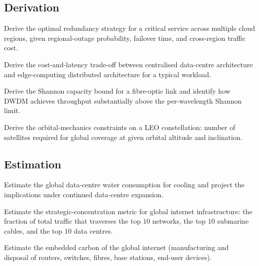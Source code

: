 \subsection*{Derivation}

\begin{exercise}
Derive the optimal redundancy strategy for a critical service across multiple cloud regions, given regional-outage probability, failover time, and cross-region traffic cost.
\end{exercise}

\begin{exercise}
Derive the cost-and-latency trade-off between centralised data-centre architecture and edge-computing distributed architecture for a typical workload.
\end{exercise}

\begin{exercise}
Derive the Shannon capacity bound for a fibre-optic link and identify how DWDM achieves throughput substantially above the per-wavelength Shannon limit.
\end{exercise}

\begin{exercise}
Derive the orbital-mechanics constraints on a LEO constellation: number of satellites required for global coverage at given orbital altitude and inclination.
\end{exercise}

\subsection*{Estimation}

\begin{exercise}
Estimate the global data-centre water consumption for cooling and project the implications under continued data-centre expansion.
\end{exercise}

\begin{exercise}
Estimate the strategic-concentration metric for global internet infrastructure: the fraction of total traffic that traverses the top $10$ networks, the top $10$ submarine cables, and the top $10$ data centres.
\end{exercise}

\begin{exercise}
Estimate the embedded carbon of the global internet (manufacturing and disposal of routers, switches, fibres, base stations, end-user devices).
\end{exercise}


